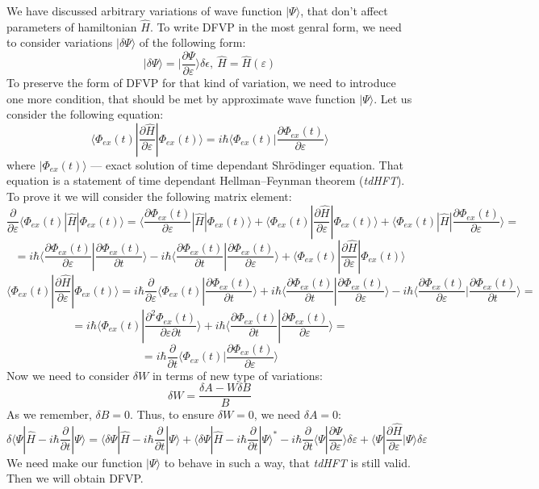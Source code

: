 We have discussed arbitrary variations of wave function $|\Psi\rangle$, that don't affect parameters of hamiltonian $\hat{H}$.
To write DFVP in the most genral form, we need to consider variations $|\delta\Psi\rangle$ of the following form:
$$|\delta\Psi\rangle=|\frac{\partial\Psi}{\partial\varepsilon}\rangle\delta\epsilon,\ \hat{H}=\hat{H}(\varepsilon)$$
To preserve the form of DFVP for that kind of variation, we need to introduce one more condition, 
that should be met by approximate wave function $|\Psi\rangle$.
Let us consider the following equation:
$$\langle\Phi_{ex}(t)|\frac{\partial\hat{H}}{\partial\varepsilon}|\Phi_{ex}(t)\rangle = %
  i\hbar\langle\Phi_{ex}(t)|\frac{\partial\Phi_{ex}(t)}{\partial\varepsilon}\rangle$$
where $|\Phi_{ex}(t)\rangle$ --- exact solution of time dependant Shr\"{o}dinger equation.
That equation is a statement of time dependant Hellman--Feynman theorem (\textit{tdHFT}). 
To prove it we will consider the following matrix element:
$$\frac{\partial}{\partial\varepsilon}\langle\Phi_{ex}(t)|\hat{H}|\Phi_{ex}(t)\rangle=%
				      \langle\frac{\partial\Phi_{ex}(t)}{\partial\varepsilon}|\hat{H}|\Phi_{ex}(t)\rangle+%
				      \langle\Phi_{ex}(t)|\frac{\partial\hat{H}}{\partial\varepsilon}|\Phi_{ex}(t)\rangle+%
				      \langle\Phi_{ex}(t)|\hat{H}|\frac{\partial\Phi_{ex}(t)}{\partial\varepsilon}\rangle=$$
$$=i\hbar\langle\frac{\partial\Phi_{ex}(t)}{\partial\varepsilon}|\frac{\partial\Phi_{ex}(t)}{\partial t}\rangle-%
   i\hbar\langle\frac{\partial\Phi_{ex}(t)}{\partial t}|\frac{\partial\Phi_{ex}(t)}{\partial\varepsilon}\rangle+
   \langle\Phi_{ex}(t)|\frac{\partial\hat{H}}{\partial\varepsilon}|\Phi_{ex}(t)\rangle$$
$$\langle\Phi_{ex}(t)|\frac{\partial\hat{H}}{\partial\varepsilon}|\Phi_{ex}(t)\rangle=%
  i\hbar\frac{\partial}{\partial\varepsilon}\langle\Phi_{ex}(t)|\frac{\partial\Phi_{ex}(t)}{\partial t}\rangle+%
  i\hbar\langle\frac{\partial\Phi_{ex}(t)}{\partial t}|\frac{\partial\Phi_{ex}(t)}{\partial\varepsilon}\rangle-%
  i\hbar\langle\frac{\partial\Phi_{ex}(t)}{\partial\varepsilon}|\frac{\partial\Phi_{ex}(t)}{\partial t}\rangle=$$
$$=i\hbar\langle\Phi_{ex}(t)|\frac{\partial^2\Phi_{ex}(t)}{\partial\varepsilon\partial t}\rangle+%
   i\hbar\langle\frac{\partial\Phi_{ex}(t)}{\partial t}|\frac{\partial\Phi_{ex}(t)}{\partial\varepsilon}\rangle=$$
$$=i\hbar\frac{\partial}{\partial t}\langle\Phi_{ex}(t)|\frac{\partial\Phi_{ex}(t)}{\partial\varepsilon}\rangle$$
Now we need to consider $\delta W$ in terms of new type of variations:
$$\delta W = \frac{\delta A - W\delta B}{B}$$
As we remember, $\delta B = 0$. Thus, to ensure $\delta W = 0$, we need $\delta A = 0$:
$$\delta\langle\Psi|\hat{H}-i\hbar\frac{\partial}{\partial t}|\Psi\rangle=%
	\langle\delta\Psi|\hat{H}-i\hbar\frac{\partial}{\partial t}|\Psi\rangle + %
	\langle\delta\Psi|\hat{H}-i\hbar\frac{\partial}{\partial t}|\Psi\rangle^*-%
	i\hbar\frac{\partial}{\partial t}\langle\Psi|\frac{\partial\Psi}{\partial\varepsilon}\rangle\delta\varepsilon+%
	\langle\Psi|\frac{\partial\hat{H}}{\partial\varepsilon}|\Psi\rangle\delta\varepsilon
	$$
We need make our function $|\Psi\rangle$ to behave in such a way, that \textit{tdHFT} is still valid. Then we will obtain DFVP.
